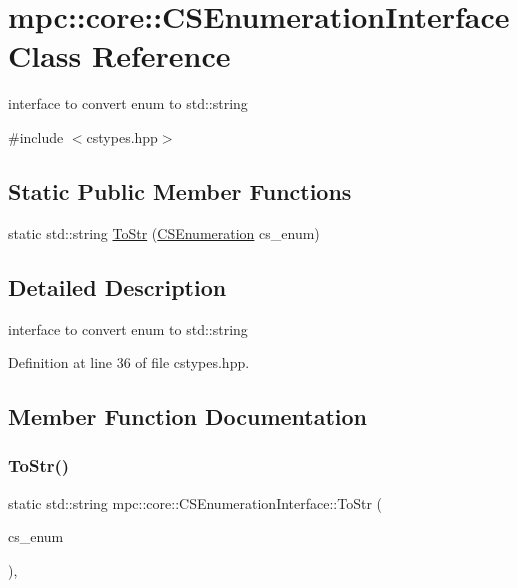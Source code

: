 \hypertarget{structmpc_1_1core_1_1_c_s_enumeration_interface}{}\section{mpc\+:\+:core\+:\+:C\+S\+Enumeration\+Interface Class Reference}
\label{structmpc_1_1core_1_1_c_s_enumeration_interface}


interface to convert enum to std\+::string  




{\ttfamily \#include $<$cstypes.\+hpp$>$}

\subsection*{Static Public Member Functions}
\begin{DoxyCompactItemize}
\item 
static std\+::string \mbox{\hyperlink{structmpc_1_1core_1_1_c_s_enumeration_interface_add9c44f757aec342db7191224f0ae2da}{To\+Str}} (\mbox{\hyperlink{namespacempc_1_1core_ad3e8e7d43bfc9202d954d999f7d5c991}{C\+S\+Enumeration}} cs\+\_\+enum)
\end{DoxyCompactItemize}


\subsection{Detailed Description}
interface to convert enum to std\+::string 

Definition at line 36 of file cstypes.\+hpp.



\subsection{Member Function Documentation}
\mbox{\label{structmpc_1_1core_1_1_c_s_enumeration_interface_add9c44f757aec342db7191224f0ae2da}} 
\subsubsection{\texorpdfstring{To\+Str()}{ToStr()}}
{\footnotesize\ttfamily static std\+::string mpc\+::core\+::\+C\+S\+Enumeration\+Interface\+::\+To\+Str (\begin{DoxyParamCaption}\item[{\mbox{\hyperlink{namespacempc_1_1core_ad3e8e7d43bfc9202d954d999f7d5c991}{C\+S\+Enumeration}}}]{cs\+\_\+enum }\end{DoxyParamCaption})\hspace{0.3cm}{\ttfamily [inline]}, {\ttfamily [static]}}



